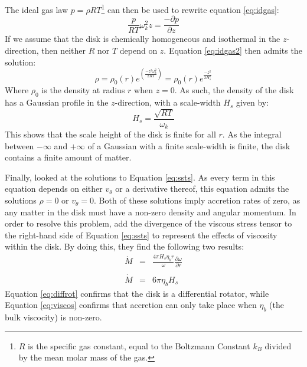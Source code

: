 The ideal gas law $p=\rho RT$\footnote{$R$ is the specific gas constant, equal to the Boltzmann Constant $k_B$ divided by the mean molar mass of the gas.} can then be used to rewrite equation \ref{eq:idgas}:
\begin{equation}
\frac{p}{RT}\omega_k^2 z=\frac{-\partial p}{\partial z}\label{eq:idgas2}
\end{equation}
If we assume that the disk is chemically homogeneous and isothermal in the $z$-direction, then neither $R$ nor $T$ depend on $z$.  Equation \ref{eq:idgas2} then admits the solution:
\begin{equation}
\rho=\rho_0(r)e^{\left(\frac{-z^2\omega_k^2}{2RT}\right)}=\rho_0(r)e^{\frac{-z^2}{2H_s^2}}
\end{equation}
Where $\rho_0$ is the density at radius $r$ when $z=0$.  As such, the density of the disk has a Gaussian profile in the $z$-direction, with a scale-width $H_s$ given by:
\begin{equation}
H_s=\frac{\sqrt{RT}}{\omega_k}
\end{equation}
This shows that the scale height of the disk is finite for all $r$.  As the integral between $-\infty$ and $+\infty$ of a Gaussian with a finite scale-width is finite, the disk contains a finite amount of matter.
\par Finally, \citeauthor{Shakura_Disk} looked at the solutions to Equation \ref{eq:ssts}.  As every term in this equation depends on either $v_\theta$ or a derivative thereof, this equation admits the solutions $\rho=0$ or $v_\theta=0$.  Both of these solutions imply accretion rates of zero, as any matter in the disk must have a non-zero density and angular momentum.  In order to resolve this problem, \citet{Shakura_Disk} add the divergence of the viscous stress tensor \citep{Landau_Tensor} to the right-hand side of Equation \ref{eq:ssts} to represent the effects of viscosity within the disk.  By doing this, they find the following two results:
\begin{eqnarray}
\dot{M}&=&\frac{4\pi H_s\eta_b r}{\omega}\frac{\partial\omega}{\partial r}\label{eq:diffrot}\\\nonumber\\
\dot{M}&=&6\pi\eta_b H_s\label{eq:viscos}
\end{eqnarray}
Equation \ref{eq:diffrot} confirms that the disk is a differential rotator, while Equation \ref{eq:viscos} confirms that accretion can only take place when $\eta_b$ (the bulk viscocity) is non-zero.
